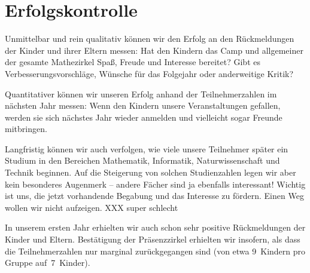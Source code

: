 \documentclass[12pt]{zettel}
\begin{document}
\section{Erfolgskontrolle}

Unmittelbar und rein qualitativ können wir den Erfolg an den Rückmeldungen der
Kinder und ihrer Eltern messen: Hat den Kindern das Camp und allgemeiner der
gesamte Mathezirkel Spaß, Freude und Interesse bereitet? Gibt es
Verbesserungsvorschläge, Wünsche für das Folgejahr oder anderweitige Kritik?

Quantitativer können wir unseren Erfolg anhand der Teilnehmerzahlen im nächsten
Jahr messen: Wenn den Kindern unsere Veranstaltungen gefallen, werden sie sich
nächstes Jahr wieder anmelden und vielleicht sogar Freunde mitbringen.

Langfristig können wir auch verfolgen, wie viele unsere Teilnehmer später ein
Studium in den Bereichen Mathematik, Informatik, Naturwissenschaft und Technik
beginnen. Auf die Steigerung von solchen Studienzahlen legen wir aber kein
besonderes Augenmerk -- andere Fächer sind ja ebenfalls interessant! Wichtig
ist uns, die jetzt vorhandende Begabung und das Interesse zu fördern. Einen Weg
wollen wir nicht aufzeigen. XXX super schlecht

In unserem ersten Jahr erhielten wir auch schon sehr positive Rückmeldungen der
Kinder und Eltern. Bestätigung der Präsenzzirkel erhielten wir insofern, als
dass die Teilnehmerzahlen nur marginal zurückgegangen sind (von etwa 9~Kindern
pro Gruppe auf~7~Kinder).
\end{document}
